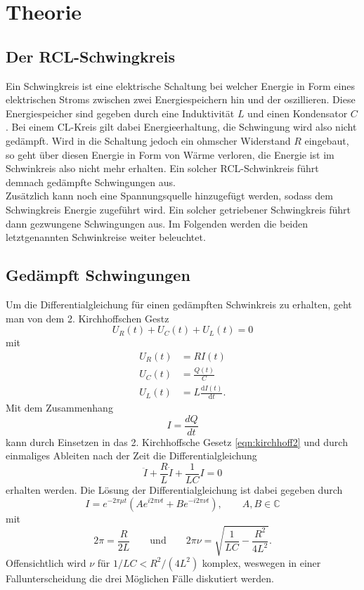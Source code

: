 \section{Theorie}
\label{sec:Theorie}
\subsection{Der RCL-Schwingkreis}
\label{sec:RCL}
Ein Schwingkreis ist eine elektrische Schaltung bei welcher Energie in Form eines elektrischen Stroms zwischen zwei Energiespeichern hin 
und der oszillieren. Diese Energiespeicher sind gegeben durch eine Induktivität $L$ und einen Kondensator $C$. Bei einem CL-Kreis gilt dabei
Energieerhaltung, die Schwingung wird also nicht gedämpft. Wird in die Schaltung jedoch ein ohmscher Widerstand $R$ eingebaut, so geht über 
diesen Energie in Form von Wärme verloren, die Energie ist im Schwinkreis also nicht mehr erhalten. Ein solcher RCL-Schwinkreis führt demnach
gedämpfte Schwingungen aus.\\\noindent
Zusätzlich kann noch eine Spannungsquelle hinzugefügt werden, sodass dem Schwingkreis Energie zugeführt wird. Ein solcher getriebener 
Schwingkreis führt dann gezwungene Schwingungen aus.
Im Folgenden werden die beiden letztgenannten Schwinkreise weiter beleuchtet.

\subsection{Gedämpft Schwingungen}
\label{sec:gedämpft}
Um die Differentialgleichung für einen gedämpften Schwinkreis zu erhalten, geht man von dem 2. Kirchhoffschen Gestz
\begin{equation}
    U_R(t)+U_C(t)+U_L(t)=0
    \label{eqn:kirchhoff2}
\end{equation}
mit
\begin{align*}
U_R(t)&=RI(t)                           \\
U_C(t)&=\frac{Q(t)}{C}                  \\
U_L(t)&=L\frac{\text{d}I(t)}{\text{d}t}    .
\end{align*}
Mit dem Zusammenhang 
\begin{equation*}
    I=\frac{dQ}{dt}
\end{equation*}
kann durch Einsetzen in das 2. Kirchhoffsche Gesetz \eqref{eqn:kirchhoff2} und durch einmaliges Ableiten nach der Zeit
die Differentialgleichung
\begin{equation}
    \ddot{I}+\frac{R}{L}\dot{I}+\frac{1}{LC}I=0
    \label{eqn:DGL1}
\end{equation}
erhalten werden. Die Lösung der Differentialgleichung ist dabei gegeben durch
\begin{equation}
    I=e^{-2\pi\mu t}\left(Ae^{i2\pi\nu t}+Be^{-i2\pi\nu t}\right), \qquad A,B\in\mathbb{C}
    \label{eqn:Losung1}
\end{equation}
mit
\begin{equation*}
    2\pi=\frac{R}{2L} 
    \qquad\text{und}\qquad 
    2\pi \nu=\sqrt{\frac{1}{LC}-\frac{R^2}{4L^2}} .
\end{equation*}
Offensichtlich wird $\nu$ für $1/LC<R^2/(4L^2)$ komplex, weswegen in einer Fallunterscheidung die drei Möglichen Fälle 
diskutiert werden.

